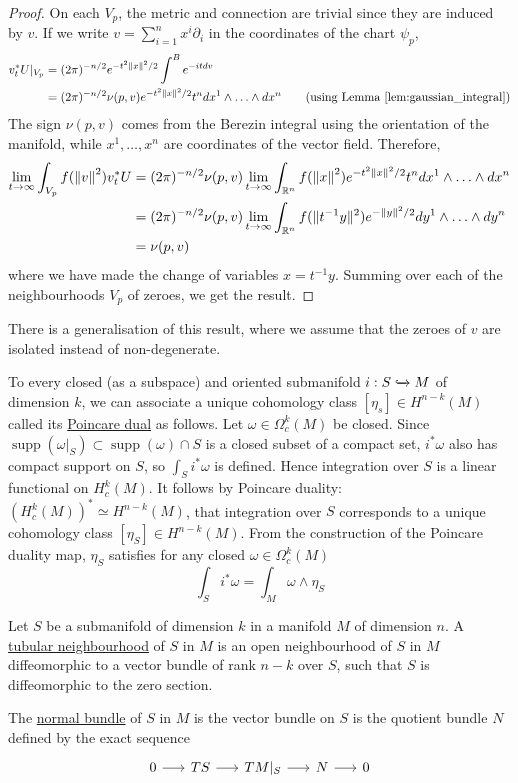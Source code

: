 \begin{proof}
	On each $V_p$, the metric and connection are trivial since they are induced 
	by $v$. If we write $v= \sum_{i=1}^{n} x^i \partial_i$ in the coordinates of
	the chart $\psi_p$,
	\begin{align*}
		v_t^*U |_{V_p} 
		&= (2\pi)^{-n/2} e^{-t^2\norm{x}^2 /2} \int^B e^{-itdv} \\
		&= (2\pi)^{-n/2} \nu(p,v) e^{-t^2\norm{x}^2 /2} t^n dx^1 \wedge
		\ldots\wedge dx^n \tag{using Lemma \ref{lem:gaussian_integral}}
	\end{align*}
	The sign $\nu(p,v)$ comes from the Berezin integral using the orientation of
	the manifold, while $x^1,\ldots,x^n$ are coordinates of the vector field. 
	Therefore, 
	\begin{align*}
		\lim_{t \to \infty} \int_{V_p} f(\norm{v}^2)v_t^*U 
		&= (2\pi)^{-n/2} \nu(p,v) 
		\lim_{t \to \infty} \int_{\mathbb{R}^n}
		f(\norm{x}^2) e^{-t^2\norm{x}^2 /2} t^n dx^1 \wedge \ldots\wedge dx^n\\
		&= (2\pi)^{-n/2} \nu(p,v) 
		\lim_{t \to \infty} \int_{\mathbb{R}^n} 
		f(\norm[*]{t^{-1}y}^2) e^{-\norm{y}^2 /2} dy^1 \wedge \ldots\wedge dy^n\\
		&= \nu(p,v) 
	\end{align*}
	where we have made the change of variables $x=t^{-1}y$. Summing over each of
	the neighbourhoods $V_p$ of zeroes, we get the result.
\end{proof}

There is a generalisation of this result, where we assume that the zeroes
of $v$ are isolated instead of non-degenerate.\cite[Theorem 1.58]{bgv} 

To every closed (as a subspace) and oriented submanifold $i: S
\xhookrightarrow{} M$ of dimension  $k$, we can
associate a unique cohomology class  $[\eta_s]\in H^{n-k}(M)$ called its
\underline{Poincare dual} as follows. Let $\omega\in \Omega_c^k(M)$ be closed.
Since $\operatorname{supp}(\omega|_S) \subset \operatorname{supp}(\omega) \cap
S$ is a closed subset of a compact set, $i^*\omega$ also has compact support on
$S$, so  $\int_S i^*\omega$ is defined. Hence integration over  $S$ is a  
linear functional on $H^k_c(M)$. It follows by Poincare duality:
$(H_c^k(M))^*\simeq H^{n-k}(M)$, that integration over $S$ corresponds to a
unique cohomology class $[\eta_S]\in H^{n-k}(M)$. 
From the construction of the Poincare duality map, $\eta_S$ satisfies
for any closed $\omega\in \Omega^k_c(M)$
\[
\int_S i^*\omega = \int_M \omega \wedge \eta_S
\] 
\begin{defn}
	Let $S$ be a submanifold of dimension  $k$ in a manifold  $M$ of dimension
	$n$. A \underline{tubular neighbourhood} of  $S$ in  $M$ is an open
	neighbourhood of  $S$ in  $M$ diffeomorphic to a vector bundle of rank
	$n-k$ over  $S$, such that  $S$ is diffeomorphic to the zero section.

	The \underline{normal bundle} of $S$ in  $M$ is the vector bundle on  $S$
	is the quotient bundle $N$ defined by the exact sequence 
	\[
	\begin{tikzcd}[column sep = 1.6em]
		0 \arrow[r] & TS \arrow[r] & TM|_S \arrow[r] 
						& N \arrow[r] & 0
	\end{tikzcd}
	\] 	
\end{defn}

